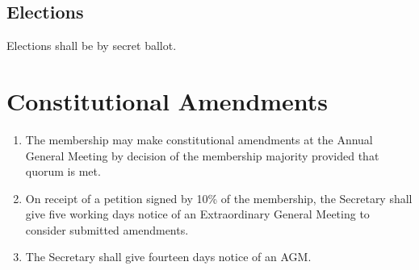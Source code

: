 \documentclass{report}
\begin{document}
\section{Elections}
	Elections shall be by secret ballot.
\chapter{Constitutional Amendments}
		\begin{enumerate}
			\item{The membership may make constitutional amendments at the Annual General Meeting by decision of the membership majority provided that quorum is met.}
			\item{On receipt of a petition signed by 10\% of the membership, the Secretary shall give five working days notice of an Extraordinary General Meeting to consider submitted amendments.}
			\item{The Secretary shall give fourteen days notice of an AGM.}
		\end{enumerate}
\end{document}
